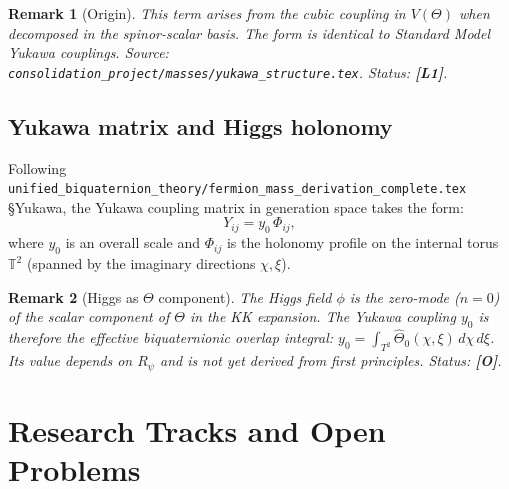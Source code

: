 \documentclass[11pt,a4paper]{article}
\newtheorem{remark}{Remark}
\begin{document}
\begin{remark}[Origin]
  This term arises from the cubic coupling in $V(\Theta)$ when decomposed
  in the spinor-scalar basis.  The form is identical to Standard Model
  Yukawa couplings.  Source: \texttt{consolidation\_project/masses/yukawa\_structure.tex}.
  Status: \textbf{[L1]}.
\end{remark}

\subsection{Yukawa matrix and Higgs holonomy}

Following \texttt{unified\_biquaternion\_theory/fermion\_mass\_derivation\_complete.tex}
§Yukawa, the Yukawa coupling matrix in generation space takes the form:
\begin{equation}
  Y_{ij} = y_0\, \Phi_{ij},
\end{equation}
where $y_0$ is an overall scale and $\Phi_{ij}$ is the holonomy profile on
the internal torus $\mathbb{T}^2$ (spanned by the imaginary directions
$\chi, \xi$).

\begin{remark}[Higgs as \texorpdfstring{$\Theta$}{Theta} component]
  The Higgs field $\phi$ is the zero-mode ($n=0$) of the scalar component
  of $\Theta$ in the KK expansion.  The Yukawa coupling $y_0$ is therefore
  the effective biquaternionic overlap integral:
  $y_0 = \int_{T^2} \hat\Theta_0(\chi,\xi)\, d\chi\, d\xi$.
  Its value depends on $R_\psi$ and is not yet derived from first principles.
  Status: \textbf{[O]}.
\end{remark}

\section{Research Tracks and Open Problems}
\label{sec:open}
\end{document}
